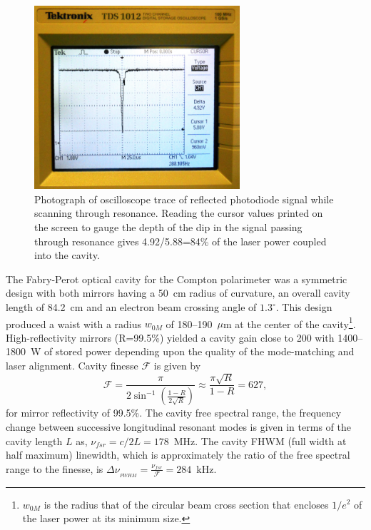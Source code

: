\begin{figure}[!h]
\begin{center}
\includegraphics[width=3in]{./Pictures/RPD_signal.png}
\caption{Photograph of oscilloscope trace of reflected photodiode signal while scanning through resonance. Reading the cursor values printed on the screen to gauge the depth of the dip in the signal passing through resonance gives 4.92/5.88=84\% of the laser power coupled into the cavity.}
\label{fig:RPD_signal}
\end{center}
\end{figure}

The Fabry-Perot optical cavity for the Compton polarimeter was a symmetric design with both mirrors having a 50~cm radius of curvature, an overall cavity length of 84.2~cm and an electron beam crossing angle of $1.3^{\circ}$. This design produced a waist with a radius $w_{0M}$  of 180--190~$\mu$m at the center of the cavity\footnote{$w_{0M}$ is the radius that of the circular beam cross section that encloses $1/e^2$ of the laser power at its minimum size.}. High-reflectivity mirrors (R=99.5\%) yielded a cavity gain close to 200 with 1400--1800~W of stored power depending upon the quality of the mode-matching and laser alignment. Cavity finesse $\mathcal{F}$ is given by
\begin{equation}
\mathcal{F}=\frac{\pi}{2\sin^{-1}\left(\frac{1-R}{2\sqrt{R}}\right)}\approx \frac{\pi \sqrt{R}}{1-R}=627,
\end{equation}
for mirror reflectivity of 99.5\%. The cavity free spectral range, the frequency change between successive longitudinal resonant modes is given in terms of the cavity length $L$ as, $\nu_{fsr}=c/2L=178$~MHz. The cavity FHWM (full width at half maximum) linewidth, which is approximately the ratio of the free spectral range to the finesse, is $\Delta \nu_{_{FWHM}}=\frac{\nu_{fsr}}{\mathcal{F}}=284$~kHz.

